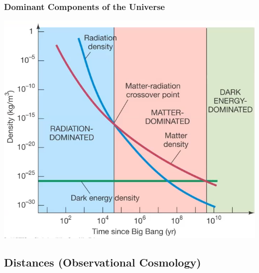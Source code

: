 \documentclass{book}
\begin{document}
\subsubsection{Dominant Components of the Universe}
\begin{center}
    \includegraphics[height = 0.4\textwidth]{images/components.png}
\end{center}
\subsection{Distances (Observational Cosmology)}

\backmatter
\end{document}

